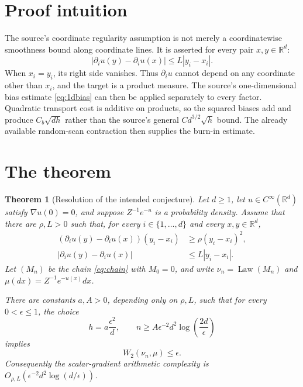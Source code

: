 \documentclass[11pt]{article}
\newtheorem{theorem}{Theorem}
\newcommand{\R}{\mathbb R}
\newcommand{\Law}{\operatorname{Law}}
\newcommand{\W}{W_2}
\begin{document}
\section{Proof intuition}

The source's coordinate regularity assumption is not merely a coordinatewise
smoothness bound along coordinate lines. It is asserted for every pair
$x,y\in\R^d$:
\[
 |\partial_i u(y)-\partial_i u(x)|\leq L|y_i-x_i|.
\]
When $x_i=y_i$, its right side vanishes. Thus $\partial_i u$ cannot depend on
any coordinate other than $x_i$, and the target is a product measure. The
source's one-dimensional bias estimate \eqref{eq:1dbias} can then be applied
separately to every factor. Quadratic transport cost is additive on products,
so the squared biases add and produce $C_b\sqrt{dh}$ rather than the source's
general $Cd^{3/2}\sqrt h$ bound. The already available random-scan contraction
then supplies the burn-in estimate.

\section{The theorem}

\begin{theorem}[Resolution of the intended conjecture]\label{thm:main}
Let $d\geq1$, let $u\in C^\infty(\R^d)$ satisfy $\nabla u(0)=0$, and suppose
$Z^{-1}e^{-u}$ is a probability density. Assume that there are
$\rho,L>0$ such that, for every $i\in\{1,\ldots,d\}$ and every
$x,y\in\R^d$,
\begin{align}
 (\partial_i u(y)-\partial_i u(x))(y_i-x_i)
 &\geq\rho(y_i-x_i)^2,\label{eq:hyp1}\\
 |\partial_i u(y)-\partial_i u(x)|
 &\leq L|y_i-x_i|.\label{eq:hyp2}
\end{align}
Let $(M_n)$ be the chain \eqref{eq:chain} with $M_0=0$, and write
$\nu_n=\Law(M_n)$ and $\mu(dx)=Z^{-1}e^{-u(x)}dx$.

There are constants $a,A>0$, depending only on $\rho,L$, such that for every
$0<\epsilon\leq1$, the choice
\[
 h=a\frac{\epsilon^2}{d},
 \qquad
 n\geq A\epsilon^{-2}d^2\log\!\left(\frac{2d}{\epsilon}\right)
\]
implies
\[
 \W(\nu_n,\mu)\leq\epsilon.
\]
Consequently the scalar-gradient arithmetic complexity is
$O_{\rho,L}(\epsilon^{-2}d^2\log(d/\epsilon))$.
\end{theorem}
\end{document}
